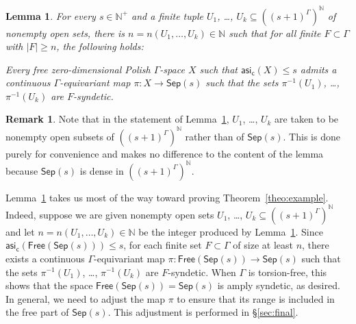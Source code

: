\documentclass[11pt,reqno,psamsfonts]{amsart}
\theoremstyle{bfnote}
\newtheorem{lemma}[theo]{Lemma}
\theoremstyle{definition}
\newtheorem{remk}[theo]{Remark}
\theoremstyle{remark}
\newcommand{\0}{\varnothing}
\renewcommand{\leq}{\leqslant}
\renewcommand{\geq}{\geqslant}
\newcommand{\acts}{\mathrel{\reflectbox{$\righttoleftarrow$}}}
\newcommand{\G}{\Gamma}
\newcommand{\Free}{\mathsf{Free}}
\newcommand{\N}{\mathbb{N}}
\newcommand{\asi}{\mathsf{asi}}
\newcommand{\casi}{\asi_{\mathsf{c}}}
\newcommand{\sr}{amply syndetic\xspace}
\newcommand{\Sep}{\mathsf{Sep}}
\numberwithin{equation}{section}
\begin{document}
    \begin{lemma}\label{lemma:key}
        For every $s \in \N^+$ and a finite tuple $U_1$, \ldots, $U_k \subseteq ((s+1)^\G)^\N$ of nonempty open sets, there is $n = n(U_1,\ldots, U_k) \in \N$ such that for all finite $F \subset \G$ with $|F| \geq n$, the following holds:
        
        \smallskip
        
        \noindent Every free zero-dimensional Polish $\G$-space $X$ %
        such that $\casi(X) \leq s$ admits a continuous $\G$-equivariant map $\pi \colon X \to \Sep(s)$ such that the sets $\pi^{-1}(U_1)$, \ldots, $\pi^{-1}(U_k)$ are $F$-syndetic.
        
    \end{lemma}

    \begin{remk}
        Note that
        in the statement of Lemma~\ref{lemma:key}, $U_1$, \ldots, $U_k$ are taken to be
        nonempty open subsets of $((s+1)^\G)^\N$ rather than of $\Sep(s)$. This is done purely for convenience and makes no difference to the content of the lemma because $\Sep(s)$ is dense in $((s+1)^\G)^\N$.
    \end{remk}

    Lemma~\ref{lemma:key} takes us most of the way toward proving Theorem~\ref{theo:example}. Indeed, suppose we are given %
    nonempty open sets $U_1$, \ldots, $U_k  \subseteq  ((s+1)^\G)^\N$ and let $n= n(U_1,\ldots, U_k) \in \N$ be the integer produced by Lemma~\ref{lemma:key}. Since $\casi(\Free(\Sep(s))) \leq s$, %
    for each finite set $F \subset \G$ of size at least $n$, there exists a continuous $\G$-equivariant map $\pi \colon \Free(\Sep(s)) \to \Sep(s)$ such that the sets $\pi^{-1}(U_1)$, \ldots, $\pi^{-1}(U_k)$ are $F$-syndetic.
    When $\G$ is torsion-free, this shows that the space $\Free(\Sep(s)) = \Sep(s)$ is \sr, as desired. In general, we need to adjust the map $\pi$ to ensure that its range is included in the free part of $\Sep(s)$. This adjustment is performed in \S\ref{sec:final}.
\end{document}
